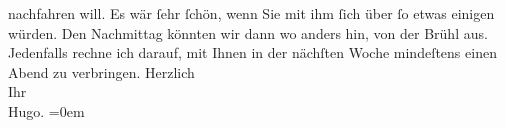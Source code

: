 \begin{ledgroupsized}[t]{13cm}
                    nachfahren will. Es wär ſehr ſchön, wenn Sie mit ihm ſich über ſo etwas einigen
                    würden. Den Nachmittag könnten wir dann wo anders hin, von der Brühl aus.\pend
           \pstart
           {\pb}Jedenfalls rechne ich
                    darauf, mit Ihnen in der nächſten Woche mindeſtens einen Abend zu
                    verbringen.\pend
           \pstart
           Herzlich{\\[\baselineskip]} Ihr{\\[\baselineskip]}\spacefill\mbox{Hugo.}\pend
           \leftskip=0em{}
         
         \endnumbering{}\end{ledgroupsized}  \newcommand{\dateiname}{L00434}\newcommand{\titel}{Hugo von Hofmannsthal an Arthur Schnitzler, [28. 4. 1895]}\newcommand{\editorInnen}{Martin Anton Müller und Gerd-Hermann Susen}
      